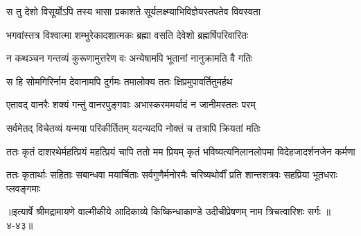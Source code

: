 \twolineshloka
{स तु देशो विसूर्योऽपि तस्य भासा प्रकाशते}
{सूर्यलक्ष्म्याभिविज्ञेयस्तपतेव विवस्वता} %

\twolineshloka
{भगवांस्तत्र विश्वात्मा शम्भुरेकादशात्मकः}
{ब्रह्मा वसति देवेशो ब्रह्मर्षिपरिवारितः} %

\twolineshloka
{न कथञ्चन गन्तव्यं कुरूणामुत्तरेण वः}
{अन्येषामपि भूतानां नानुक्रामति वै गतिः} %

\twolineshloka
{स हि सोमगिरिर्नाम देवानामपि दुर्गमः}
{तमालोक्य ततः क्षिप्रमुपावर्तितुमर्हथ} %

\twolineshloka
{एतावद् वानरैः शक्यं गन्तुं वानरपुङ्गवाः}
{अभास्करममर्यादं न जानीमस्ततः परम्} %

\twolineshloka
{सर्वमेतद् विचेतव्यं यन्मया परिकीर्तितम्}
{यदन्यदपि नोक्तं च तत्रापि क्रियतां मतिः} %

\twolineshloka
{ततः कृतं दाशरथेर्महत्प्रियं महत्प्रियं चापि ततो मम प्रियम्}
{कृतं भविष्यत्यनिलानलोपमा विदेहजादर्शनजेन कर्मणा} %

\twolineshloka
{ततः कृतार्थाः सहिताः सबान्धवा मयार्चिताः सर्वगुणैर्मनोरमैः}
{चरिष्यथोर्वीं प्रति शान्तशत्रवः सहप्रिया भूतधराः प्लवङ्गमाः} %


॥इत्यार्षे श्रीमद्रामायणे वाल्मीकीये आदिकाव्ये किष्किन्धाकाण्डे उदीचीप्रेषणम् नाम त्रिचत्वारिशः सर्गः ॥४-४३॥
